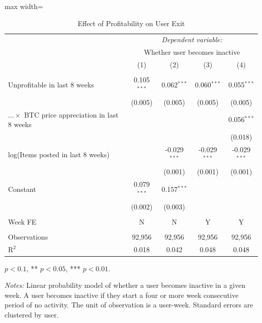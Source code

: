 \begin{table}[H]
\centering
\caption{Effect of Profitability on User Exit} 
\vspace{0.2cm}
\label{tbl_profitability_analysis}
\begin{adjustbox}{max width=\textwidth}
\begin{threeparttable}
\begin{tabular}{lcccc} 
\toprule
 & \multicolumn{4}{c}{\textit{Dependent variable:}} \\ 
 & \multicolumn{4}{c}{Whether user becomes inactive} \\ [1ex]
 & (1) & (2) & (3) & (4) \\ 
\midrule
 &  &  &  &  \\
Unprofitable in last 8 weeks  & 0.105$^{***}$ & 0.062$^{***}$ & 0.060$^{***}$ & 0.055$^{***}$ \\
 & (0.005) & (0.005) & (0.005) & (0.005) \\ [1ex] 
$\ldots \times$ BTC price appreciation in last 8 weeks  &  &  &  & 0.056$^{***}$ \\
 &  &  &  & (0.018) \\ [1ex] 
log(Items posted in last 8 weeks)  &  & -0.029$^{***}$ & -0.029$^{***}$ & -0.029$^{***}$ \\
 &  & (0.001) & (0.001) & (0.001) \\ [1ex] 
Constant  & 0.079$^{***}$ & 0.157$^{***}$ &  &  \\
 & (0.002) & (0.003) &  &  \\ [1ex] 
& & & & \\
Week FE & N & N & Y & Y \\
 & & & & \\
Observations  & 92,956 & 92,956 & 92,956 & 92,956 \\ 
R$^2$  & 0.018 & 0.042 & 0.048 & 0.048 \\ [1.8ex] 
\bottomrule
\end{tabular} 
\begin{tablenotes}[flushleft]\footnotesize
\item[] \parbox[t]{\linewidth}{%
\hfill * $p<0.1$, ** $p<0.05$, *** $p<0.01$.
}
\item \textit{Notes:} Linear probability model of whether a user becomes inactive in a given week. A user becomes inactive if they start a four or more week consecutive period of no activity. The unit of observation is a user-week. Standard errors are clustered by user.
\end{tablenotes}
\end{threeparttable}
\end{adjustbox}
\end{table}
